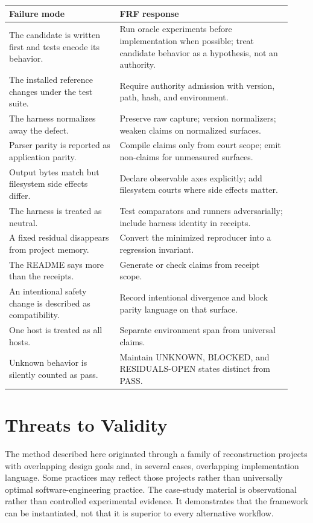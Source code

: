 \documentclass[11pt,a4paper]{article}
\begin{document}
\begin{longtable}{>{\raggedright\arraybackslash}p{0.36\linewidth}>{\raggedright\arraybackslash}p{0.57\linewidth}}
\toprule
\textbf{Failure mode} & \textbf{FRF response} \\
\midrule
\endhead
The candidate is written first and tests encode its behavior. & Run oracle experiments before implementation when possible; treat candidate behavior as a hypothesis, not an authority. \\
The installed reference changes under the test suite. & Require authority admission with version, path, hash, and environment. \\
The harness normalizes away the defect. & Preserve raw capture; version normalizers; weaken claims on normalized surfaces. \\
Parser parity is reported as application parity. & Compile claims only from court scope; emit non-claims for unmeasured surfaces. \\
Output bytes match but filesystem side effects differ. & Declare observable axes explicitly; add filesystem courts where side effects matter. \\
The harness is treated as neutral. & Test comparators and runners adversarially; include harness identity in receipts. \\
A fixed residual disappears from project memory. & Convert the minimized reproducer into a regression invariant. \\
The README says more than the receipts. & Generate or check claims from receipt scope. \\
An intentional safety change is described as compatibility. & Record intentional divergence and block parity language on that surface. \\
One host is treated as all hosts. & Separate environment span from universal claims. \\
Unknown behavior is silently counted as pass. & Maintain UNKNOWN, BLOCKED, and RESIDUALS-OPEN states distinct from PASS. \\
\bottomrule
\end{longtable}

\section{Threats to Validity}
\label{sec:threats}

The method described here originated through a family of reconstruction projects with overlapping design goals and, in several cases, overlapping implementation language. Some practices may reflect those projects rather than universally optimal software-engineering practice. The case-study material is observational rather than controlled experimental evidence. It demonstrates that the framework can be instantiated, not that it is superior to every alternative workflow.
\end{document}
